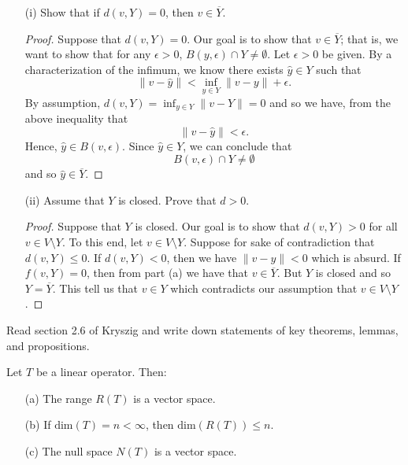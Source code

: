 \documentclass[a4paper]{article}
\begin{document}
\begin{enumerate}
    \item[(i)] Show that if \( d(v,Y) = 0  \), then \( v \in \overline{Y} \).
        \begin{proof}
            Suppose that \( d(v,Y) = 0  \). Our goal is to show that \( v \in \overline{Y} \); that is, we want to show that for any \( \epsilon > 0  \), \( B(y,\epsilon) \cap Y  \neq \emptyset \). Let \( \epsilon > 0  \) be given. By a characterization of the infimum, we know there exists \( \hat{y} \in Y  \) such that  
            \[  \|v - \hat{y} \| < \inf_{y \in Y} \|v - y\| + \epsilon. \]
            By assumption, \( d(v,Y) = \inf_{y \in Y} \|v - Y\| = 0  \) and so we have, from the above inequality that
            \[  \|v - \hat{y} \| < \epsilon. \]
            Hence, \( \hat{y} \in B(v,\epsilon)  \). Since \( \hat{y} \in Y  \), we can conclude that 
            \[  B(v,\epsilon) \cap Y \neq \emptyset  \]
            and so \( \hat{y} \in \overline{Y} \).
        \end{proof}
    \item[(ii)] Assume that \( Y  \) is closed. Prove that \( d > 0  \). 
        \begin{proof}
            Suppose that \( Y  \) is closed. Our goal is to show that \( d(v,Y) > 0  \) for all \( v \in V \setminus  Y  \). To this end, let \( v \in V \setminus  Y  \). Suppose for sake of contradiction that \( d(v,Y) \leq 0  \). If \( d(v,Y) < 0  \), then we have \( \|v - y \| < 0  \) which is absurd. If \( f(v,Y) = 0  \), then from part (a) we have that \( v \in \overline{Y} \). But \( Y  \) is closed and so \( Y = \overline{Y} \). This tell us that \( v \in  Y  \) which contradicts our assumption that \( v \in V \setminus  Y  \).
        \end{proof}
\end{enumerate}

\begin{problem}
    Read section 2.6 of Kryszig and write down statements of key theorems, lemmas, and propositions.
\end{problem}

\begin{theorem}
    Let \( T  \) be a linear operator. Then:
    \begin{enumerate}
        \item[(a)] The range \( R(T) \) is a vector space.
        \item[(b)] If \( \text{dim}(T) = n < \infty  \), then \( \text{dim}(R(T)) \leq n  \).
        \item[(c)] The null space \( N(T) \) is a vector space.
    \end{enumerate}
\end{theorem}
\end{document}

